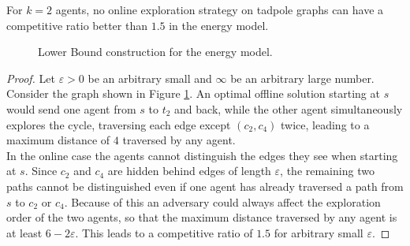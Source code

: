 \begin{theorem}\label{TadpoleEnergyLower} 
    For $k=2$ agents, no online exploration strategy on tadpole graphs can have a competitive ratio better than $1.5$ in the energy model.
\end{theorem}

\begin{figure}[H]
    \begin{center}
    \end{center}
    \caption[Lower Bound Energy Model]{Lower Bound construction for the energy model.}
    \label{fig:energybound}
\end{figure}

\begin{proof}
    Let $\varepsilon > 0$ be an arbitrary small and $\infty$ be an arbitrary large number.
    Consider the graph shown in Figure \ref{fig:energybound}. An optimal offline solution starting at $s$ would send one agent from $s$ to $t_2$ and back, while the other agent
    simultaneously explores the cycle, traversing each edge except $(c_2, c_4)$ twice, leading to a maximum distance of $4$ traversed by any agent.\\
    In the online case the agents cannot distinguish the edges they see when starting at $s$. Since $c_2$ and $c_4$ are hidden behind edges of length $\varepsilon$, the remaining two
    paths cannot be distinguished even if one agent has already traversed a path from $s$ to $c_2$ or $c_4$. Because of this an adversary could always affect the exploration
    order of the two agents, so that the maximum distance traversed by any agent is at least $6-2\varepsilon$. This leads to a competitive ratio of $1.5$ for arbitrary small $\varepsilon$.
\end{proof}

